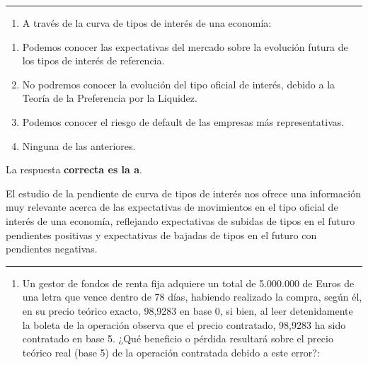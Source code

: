 \documentclass[
  letterpaper,
  DIV=11,
  numbers=noendperiod]{scrreprt}
\providecommand{\tightlist}{%
  \setlength{\itemsep}{0pt}\setlength{\parskip}{0pt}}\usepackage{longtable,booktabs,array}
\begin{document}
\begin{center}\rule{0.5\linewidth}{0.5pt}\end{center}

\begin{enumerate}
\def\labelenumi{\arabic{enumi}.}
\setcounter{enumi}{71}
\tightlist
\item
  A través de la curva de tipos de interés de una economía:
\end{enumerate}

\begin{enumerate}
\def\labelenumi{\alph{enumi})}
\item
  Podemos conocer las expectativas del mercado sobre la evolución futura
  de los tipos de interés de referencia.
\item
  No podremos conocer la evolución del tipo oficial de interés, debido a
  la Teoría de la Preferencia por la Liquidez.
\item
  Podemos conocer el riesgo de default de las empresas más
  representativas.
\item
  Ninguna de las anteriores.
\end{enumerate}

\begin{tcolorbox}[enhanced jigsaw, left=2mm, opacityback=0, colback=white, breakable, arc=.35mm, bottomrule=.15mm, rightrule=.15mm, toprule=.15mm, leftrule=.75mm, colframe=quarto-callout-tip-color-frame]
\begin{minipage}[t]{5.5mm}
\textcolor{quarto-callout-tip-color}{\faLightbulb}
\end{minipage}%
\begin{minipage}[t]{\textwidth - 5.5mm}

La respuesta \textbf{correcta es la a}.

El estudio de la pendiente de curva de tipos de interés nos ofrece una
información muy relevante acerca de las expectativas de movimientos en
el tipo oficial de interés de una economía, reflejando expectativas de
subidas de tipos en el futuro pendientes positivas y expectativas de
bajadas de tipos en el futuro con pendientes negativas.

\end{minipage}%
\end{tcolorbox}

\begin{center}\rule{0.5\linewidth}{0.5pt}\end{center}

\begin{enumerate}
\def\labelenumi{\arabic{enumi}.}
\setcounter{enumi}{72}
\tightlist
\item
  Un gestor de fondos de renta fija adquiere un total de 5.000.000 de
  Euros de una letra que vence dentro de 78 días, habiendo realizado la
  compra, según él, en su precio teórico exacto, 98,9283 en base 0, si
  bien, al leer detenidamente la boleta de la operación observa que el
  precio contratado, 98,9283 ha sido contratado en base 5. ¿Qué
  beneficio o pérdida resultará sobre el precio teórico real (base 5) de
  la operación contratada debido a este error?:
\end{enumerate}
\end{document}
